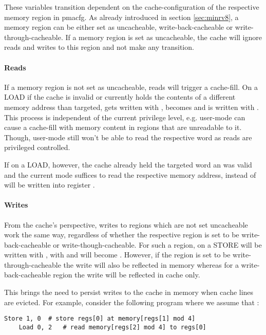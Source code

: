 These variables transition dependent on the cache-configuration of the respective memory region in \gls{pmacfg}.
As already introduced in section \ref{sec:minrv8}, a memory region can be either set as uncacheable, write-back-cacheable or write-through-cacheable.
If a memory region is set as uncacheable, the cache will ignore reads and writes to this region and not make any transition.

\paragraph{Reads}
If a memory region is not set as uncacheable, reads will trigger a cache-fill.
On a LOAD if the cache is invalid or currently holds the contents of a different memory address than targeted,  gets written with ,  becomes  and  is written with .
This process is independent of the current privilege level, e.g. user-mode can cause a cache-fill with memory content in regions that are unreadable to it.
Though, user-mode still won't be able to read the respective word as reads are privileged controlled.

If on a LOAD, however, the cache already held the targeted word an was valid and the current mode suffices to read the respective memory address,  instead of  will be written into register .

\paragraph{Writes}
From the cache's perspective, writes to regions which are not set uncacheable work the same way, regardless of whether the respective region is set to be write-back-cacheable or write-though-cacheable.
For such a region, on a STORE  will be written with ,  with  and  will become .
However, if the region is set to be write-through-cacheable the write will also be reflected in memory whereas for a write-back-cacheable region the write will be reflected in cache only.

This brings the need to persist writes to the cache in memory when cache lines are evicted.
For example, consider the following program where we assume that :
\begin{lstlisting}[language=minrv8]
    Store 1, 0  # store regs[0] at memory[regs[1] mod 4]
    Load 0, 2   # read memory[regs[2] mod 4] to regs[0]
\end{lstlisting}


